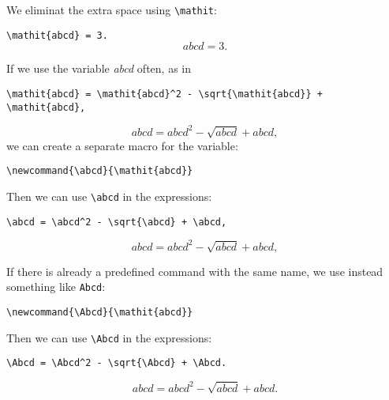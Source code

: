We eliminat the extra space using \verb+\mathit+:

\verb+\mathit{abcd} = 3.+
$$
\mathit{abcd} = 3.
$$

If we use the variable \textit{abcd} often, as in

\verb|\mathit{abcd} = \mathit{abcd}^2 - \sqrt{\mathit{abcd}} + \mathit{abcd},|

$$
\mathit{abcd} = \mathit{abcd}^2 - \sqrt{\mathit{abcd}} + \mathit{abcd},
$$
we can create a separate macro for the variable:

\verb+\newcommand{\abcd}{\mathit{abcd}}+
\newcommand{\abcd}{\mathit{abcd}}

\noindent
Then we can use \verb+\abcd+ in the expressions:

\verb|\abcd = \abcd^2 - \sqrt{\abcd} + \abcd,|

$$
\abcd = \abcd^2 - \sqrt{\abcd} + \abcd,
$$

If there is already a predefined command with the same name,
we use instead something like \verb+Abcd+:

\verb+\newcommand{\Abcd}{\mathit{abcd}}+
\newcommand{\Abcd}{\mathit{abcd}}

\noindent
Then we can use \verb+\Abcd+ in the expressions:

\verb|\Abcd = \Abcd^2 - \sqrt{\Abcd} + \Abcd.|

$$
\Abcd = \Abcd^2 - \sqrt{\Abcd} + \Abcd.
$$


\clearpage

